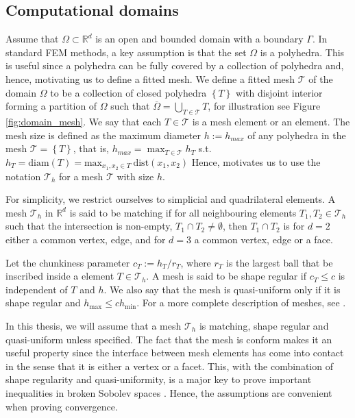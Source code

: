 \documentclass[11pt]{article}
\theoremstyle{remark}
\renewcommand{\le}{\leqslant}
\numberwithin{equation}{section}
\begin{document}
\subsection{Computational domains}%
\label{sub:computational_domain}
Assume that $\Omega \subset \mathbb{R} ^{d} $ is an open and bounded domain with a boundary $\Gamma $. In standard FEM methods, a key assumption is that the set $\Omega $ is a polyhedra. This is useful since a polyhedra can be fully covered by a collection of polyhedra and, hence, motivating us to define a fitted mesh.
We define a fitted mesh $\mathcal{T} $ of the domain $\Omega $ to be a collection of closed polyhedra $\left\{ T \right\}  $ with disjoint interior forming a partition of $\Omega $ such that $\overline{\Omega } = \bigcup _{T \in \mathcal{T} } T $, for illustration see Figure
\ref{fig:domain_mesh}.
We say that each $T \in  \mathcal{T} $ is a mesh element or an element.
The mesh size is defined as the maximum diameter $h := h_{max} $ of any polyhedra in the mesh $\mathcal{T} = \left\{ T \right\}  $, that is, $ h_{max} = \max_{T \in \mathcal{T} }  h_{T}$ s.t.
$h _{T}  = \mathrm{diam}\left( T \right)   = \mathrm{max}_{x_1, x_{2} \in T} \ \mathrm{ dist }(x_{1}, x_{2})$
Hence, motivates us to use the notation $\mathcal{T} _{h}$ for a mesh $\mathcal{T} $ with size $h$.

For simplicity, we restrict ourselves to simplicial and quadrilateral elements.
A mesh $\mathcal{T}_{h}$ in $ \mathbb{R} ^{d}$ is said to be matching if
for all neighbouring elements $T_{1}, T_{2} \in \mathcal{T} _{h}$ such that the intersection is non-empty, $T_{1} \cap T_{2} \neq \emptyset  $, then $T_{1}\cap T_{2}$ is for $d=2$ either a common vertex, edge, and for $d=3$ a common vertex, edge or a face.

Let the chunkiness parameter $c_{T} := h_{T}/r_{T}$, where $r_{T}$  is the largest ball that be inscribed inside a element $T \in \mathcal{T}_{h} $.
A mesh is said to be shape regular if $c_{T}\le  c$ is independent of $T$  and $h$. We also say that the mesh is quasi-uniform only if it is shape regular and $h_{\mathrm{ max }} \le  c h_{\mathrm{ min }}$.
For a more complete description of meshes, see \cite[Chapter 8]{ErnGuermond2021}.

In this thesis, we will assume that a mesh $\mathcal{T}_{h} $ is matching, shape regular and quasi-uniform unless specified.
 The fact that the mesh is conform makes it an useful property since the interface between mesh elements has come into contact in the sense
that it is either a vertex or a facet. This, with the combination of shape regularity and quasi-uniformity, is a major key to prove important inequalities in broken Sobolev spaces \cite[Chapter 1.4.1]{pietro2012}. Hence, the assumptions are
convenient when proving convergence.
\end{document}
